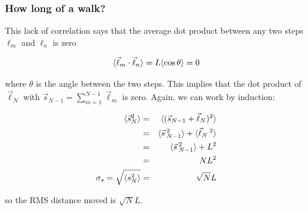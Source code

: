 \documentclass[hyperref={colorlinks=true}]{beamer}
\begin{document}

\begin{frame}%
  \frametitle{How long of a walk?}
  
  This lack of correlation says that the average dot product between any two steps $\ell_m$ and $\ell_n$ is zero
  
  \begin{equation}
    \langle \vec{\ell}_m \cdot \vec{\ell}_n \rangle = L \langle \cos\theta \rangle = 0
  \end{equation}
  
  where $\theta$ is the angle between the two steps. This implies that the dot product of $\vec{\ell}_N$ with $\vec{s}_{N-1} = \sum^{N-1}_{m=1}\vec{\ell}_m$ is zero. Again, we can work by induction:
  
  \begin{eqnarray}
    \langle  \vec{s}^2_N  \rangle  &=& \langle  (\vec{s}_{N-1} + \vec{\ell}_N)^2  \rangle \\
                          &=& \langle  \vec{s}\,^2_{N-1}  \rangle + \langle \vec{\ell}_N\,^2 \rangle \\ 
                          &=& \langle  \vec{s}\,^2_{N-1}  \rangle + L^2 \\ 
                          &=& N L^2 \\
    \sigma_s = \sqrt{\langle s^2_N \rangle} &=& \sqrt{N} L         
  \end{eqnarray}
  
  so the RMS distance moved is $\sqrt{N} L$.
  
\end{frame}

\end{document}
